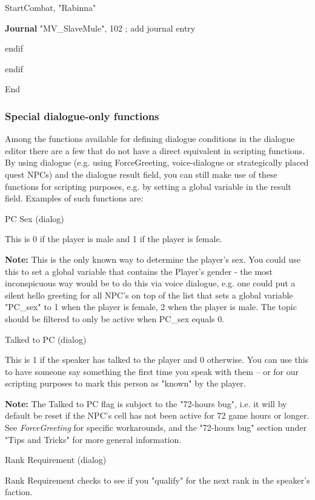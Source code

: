 \documentclass[
]{article}
\begin{document}
StartCombat, "Rabinna"

\textbf{Journal} "MV\_SlaveMule", 102 ; add journal entry

endif

endif

End

\hypertarget{special-dialogue-only-functions}{%
\subsubsection{Special dialogue-only
functions}\label{special-dialogue-only-functions}}

Among the functions available for defining dialogue conditions in the
dialogue editor there are a few that do not have a direct equivalent in
scripting functions. By using dialogue (e.g. using ForceGreeting,
voice-dialogue or strategically placed quest NPCs) and the dialogue
result field, you can still make use of these functions for scripting
purposes, e.g. by setting a global variable in the result field.
Examples of such functions are:

PC Sex (dialog)

This is 0 if the player is male and 1 if the player is female.

\textbf{Note:} This is the only known way to determine the player's sex.
You could use this to set a global variable that contains the Player's
gender - the most inconspicuous way would be to do this via voice
dialogue, e.g. one could put a silent hello greeting for all NPC's on
top of the list that sets a global variable "PC\_sex" to 1 when the
player is female, 2 when the player is male. The topic should be
filtered to only be active when PC\_sex equals 0.

Talked to PC (dialog)

This is 1 if the speaker has talked to the player and 0 otherwise. You
can use this to have someone say something the first time you speak with
them -- or for our scripting purposes to mark this person as "known" by
the player.

\textbf{Note:} The Talked to PC flag is subject to the "72-hours bug",
i.e. it will by default be reset if the NPC's cell has not been active
for 72 game hours or longer. See \emph{ForceGreeting} for specific
workarounds, and the "72-hours bug" section under "Tips and Tricks" for
more general information.

Rank Requirement (dialog)

Rank Requirement checks to see if you "qualify" for the next rank in the
speaker's faction.
\end{document}
